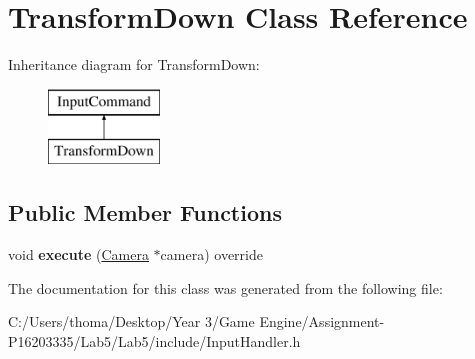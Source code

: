\hypertarget{class_transform_down}{}\section{Transform\+Down Class Reference}
\label{class_transform_down}
Inheritance diagram for Transform\+Down\+:\begin{figure}[H]
\begin{center}
\leavevmode
\includegraphics[height=2.000000cm]{class_transform_down}
\end{center}
\end{figure}
\subsection*{Public Member Functions}
\begin{DoxyCompactItemize}
\item 
\mbox{\label{class_transform_down_aee70fecfd3acbb22bca5d49a7768b637}} 
void {\bfseries execute} (\mbox{\hyperlink{class_camera}{Camera}} $\ast$camera) override
\end{DoxyCompactItemize}


The documentation for this class was generated from the following file\+:\begin{DoxyCompactItemize}
\item 
C\+:/\+Users/thoma/\+Desktop/\+Year 3/\+Game Engine/\+Assignment-\/\+P16203335/\+Lab5/\+Lab5/include/Input\+Handler.\+h\end{DoxyCompactItemize}
